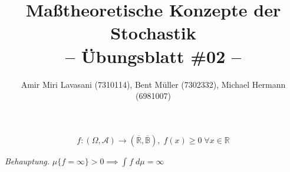 \documentclass[10pt]{article}
\newcommand{\beh}{\textit{Behauptung. }}
\newenvironment{Aufgabe}[2][Aufgabe]{\begin{trivlist}
\item[\hskip \labelsep {\bfseries #1}\hskip \labelsep {\bfseries #2.}]}{\end{trivlist}}
\begin{document}
 
\title{ \textbf{Maßtheoretische Konzepte der Stochastik \\ -- Übungsblatt \#02 --} }

\author{Amir Miri Lavasani (7310114), Bent Müller (7302332),
        Michael Hermann (6981007)}
\maketitle

\begin{Aufgabe}{1} %
	\[
	f: \left(
		\Omega, \mathcal{A}
	\right) \longrightarrow \left(
		\overline{\mathbb{R}}, \overline{\mathbb{B}}
	\right) , \;
	f(x) \geq 0 \; \forall x \in \mathbb{R} 
	\]
\end{Aufgabe}

\beh $\mu \{f= \infty \} > 0 \implies \int_{}^{} f \; d\mu = \infty $
\end{document}

